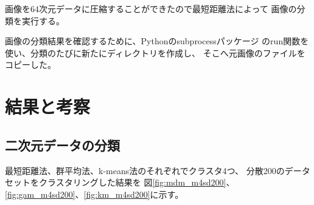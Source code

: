 \documentclass[dvipdfmx]{jsarticle}
\begin{document}
画像を64次元データに圧縮することができたので最短距離法によって
画像の分類を実行する。

画像の分類結果を確認するために、Pythonのsubprocessパッケージ
のrun関数を使い、分類のたびに新たにディレクトリを作成し、
そこへ元画像のファイルをコピーした。

\section{結果と考察}

\subsection{二次元データの分類}

最短距離法、群平均法、k-means法のそれぞれでクラスタ4つ、
分散200のデータセットをクラスタリングした結果を
図\ref{fig:mdm_m4sd200}、\ref{fig:gam_m4sd200}、\ref{fig:km_m4sd200}に示す。
\end{document}
